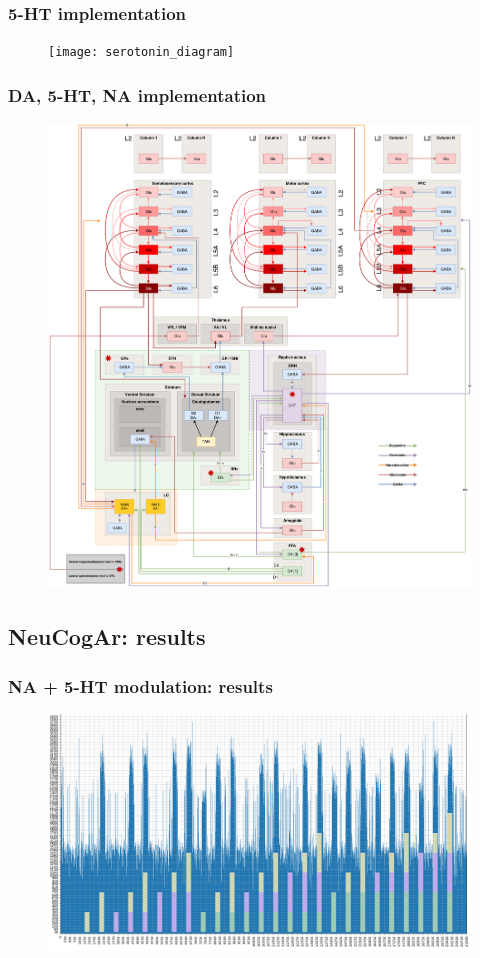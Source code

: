 \documentclass[12pt, aspectratio=169]{beamer}
\begin{document}
\begin{frame}
\frametitle{5-HT implementation}
\begin{figure}
\texttt{[image: serotonin\_diagram]}
\end{figure}
\end{frame}
\begin{frame}
\frametitle{DA, 5-HT, NA implementation}
\begin{figure}
\includegraphics[width=0.5\linewidth]{DA_5-HT_NA_pathways}
\end{figure}
\end{frame}
\subsection{NeuCogAr: results}
\begin{frame}
\frametitle{NA + 5-HT modulation: results}
\begin{figure}
\includegraphics[width=0.9\linewidth]{cube_results.png}
\end{figure}
\end{frame}
\end{document}
